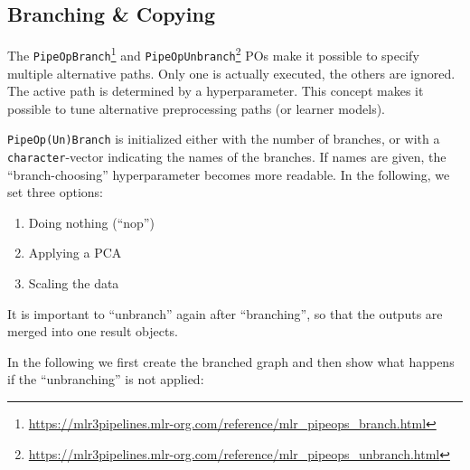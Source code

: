 \documentclass[12pt,]{scrbook}
\newenvironment{Shaded}{}{}
\newcommand{\DataTypeTok}[1]{#1}
\newcommand{\KeywordTok}[1]{\textcolor[rgb]{0.00,0.00,1.00}{#1}}
\newcommand{\NormalTok}[1]{#1}
\newcommand{\OperatorTok}[1]{#1}
\newcommand{\StringTok}[1]{\textcolor[rgb]{0.00,0.50,0.50}{#1}}
\providecommand{\tightlist}{%
  \setlength{\itemsep}{0pt}\setlength{\parskip}{0pt}}
\renewcommand{\href}[2]{#2\footnote{\url{#1}}}
\begin{document}
\hypertarget{pipe-model-ensembles-branching-copying}{%
\subsection{Branching \& Copying}\label{pipe-model-ensembles-branching-copying}}

The \href{https://mlr3pipelines.mlr-org.com/reference/mlr_pipeops_branch.html}{\texttt{PipeOpBranch}} and \href{https://mlr3pipelines.mlr-org.com/reference/mlr_pipeops_unbranch.html}{\texttt{PipeOpUnbranch}} POs make it possible to specify multiple alternative paths.
Only one is actually executed, the others are ignored.
The active path is determined by a hyperparameter.
This concept makes it possible to tune alternative preprocessing paths (or learner models).

\texttt{PipeOp(Un)Branch} is initialized either with the number of branches, or with a \texttt{character}-vector indicating the names of the branches.
If names are given, the ``branch-choosing'' hyperparameter becomes more readable.
In the following, we set three options:

\begin{enumerate}
\def\labelenumi{\arabic{enumi}.}
\tightlist
\item
  Doing nothing (``nop'')
\item
  Applying a PCA
\item
  Scaling the data
\end{enumerate}

It is important to ``unbranch'' again after ``branching'', so that the outputs are merged into one result objects.

In the following we first create the branched graph and then show what happens if the ``unbranching'' is not applied:

\begin{Shaded}
\end{Shaded}
\end{document}
